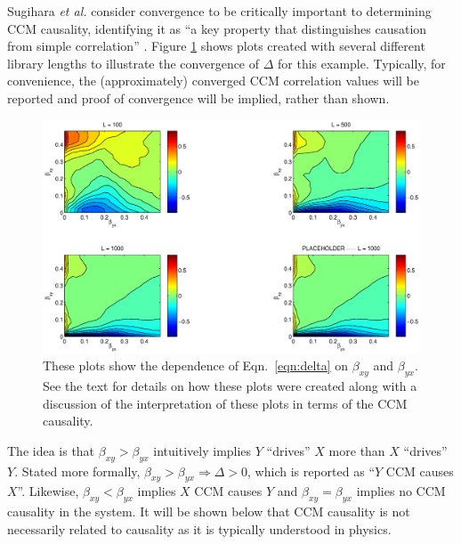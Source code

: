 \documentclass[a4paper,11pt]{article}
\begin{document}
Sugihara {\em et al. }consider convergence to be critically important to determining CCM causality, identifying it as ``a key property that distinguishes causation from simple correlation'' \cite{Sugihara2012}.  Figure \ref{fig:} shows plots created with several different library lengths to illustrate the convergence of $\Delta$ for this example.  Typically, for convenience, the (approximately) converged CCM correlation values will be reported and proof of convergence will be implied, rather than shown.
\begin{figure}[ht]
\label{fig:}
\includegraphics[scale=0.6]{Figure1.eps}
\caption{These plots show the dependence of Eqn.\ \ref{eqn:delta} on $\beta_{xy}$ and $\beta_{yx}$.  See the text for details on how these plots were created along with a discussion of the interpretation of these plots in terms of the CCM causality.}
\end{figure}
The idea is that $\beta_{xy}>\beta_{yx}$ intuitively implies $Y$ ``drives'' $X$ more than $X$ ``drives'' $Y$.  Stated more formally, $\beta_{xy}>\beta_{yx}\Rightarrow\Delta>0$, which is reported as ``$Y$ CCM causes $X$''.  Likewise, $\beta_{xy}<\beta_{yx}$ implies $X$ CCM causes $Y$ and $\beta_{xy}=\beta_{yx}$ implies no CCM causality in the system.  It will be shown below that CCM causality is not necessarily related to causality as it is typically understood in physics.
\end{document}
